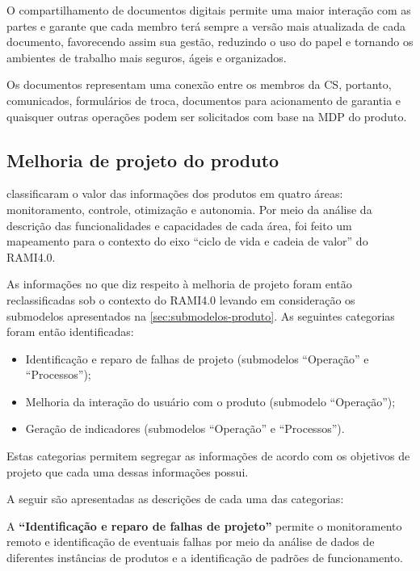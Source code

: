 O compartilhamento de documentos digitais permite uma maior interação com as partes e garante que cada membro terá sempre a versão mais atualizada de cada documento, favorecendo assim sua gestão, reduzindo o uso do papel e tornando os ambientes de trabalho mais seguros, ágeis e organizados.

Os documentos representam uma conexão entre os membros da CS, portanto, comunicados, formulários de troca, documentos para acionamento de garantia e quaisquer outras operações podem ser solicitados com base na MDP do produto.

\subsection{Melhoria de projeto do produto}
\label{sub:melhoria-projeto}

 classificaram o valor das informações dos produtos em quatro áreas: monitoramento, controle, otimização e autonomia. Por meio da análise da descrição das funcionalidades e capacidades de cada área, foi feito um mapeamento para o contexto do eixo ``ciclo de vida e cadeia de valor'' do RAMI4.0.

As informações no que diz respeito à melhoria de projeto foram então reclassificadas sob o contexto do RAMI4.0 levando em consideração os submodelos apresentados na \autoref{sec:submodelos-produto}. As seguintes categorias foram então identificadas:

\begin{itemize}
	\item Identificação e reparo de falhas de projeto (submodelos ``Operação'' e ``Processos'');
	\item Melhoria da interação do usuário com o produto (submodelo ``Operação'');
	\item Geração de indicadores (submodelos ``Operação'' e ``Processos'').
\end{itemize}

Estas categorias permitem segregar as informações de acordo com os objetivos de projeto que cada uma dessas informações possui.

A seguir são apresentadas as descrições de cada uma das categorias:

A \textbf{``Identificação e reparo de falhas de projeto''} permite o monitoramento remoto e identificação de eventuais falhas por meio da análise de dados de diferentes instâncias de produtos e a identificação de padrões de funcionamento.

